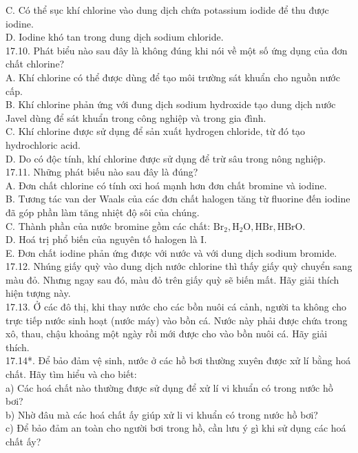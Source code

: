 \documentclass[10pt]{article}
\begin{document}
\begin{enumerate}
C. Có thể sục khí chlorine vào dung dịch chứa potassium iodide để thu được iodine.\\
D. Iodine khó tan trong dung dịch sodium chloride.\\
17.10. Phát biểu nào sau đây là không đúng khi nói về một số ứng dụng của đơn chất chlorine?\\
A. Khí chlorine có thể được dùng để tạo môi trường sát khuẩn cho nguồn nước cấp.\\
B. Khí chlorine phản ứng với đung dịch sodium hydroxide tạo dung dịch nước Javel dùng để sát khuẩn trong công nghiệp và trong gia đình.\\
C. Khí chlorine được sử dụng để sản xuất hydrogen chloride, từ đó tạo hydrochloric acid.\\
D. Do có độc tính, khí chlorine được sử dụng để trừ sâu trong nông nghiệp.\\
17.11. Những phát biếu nào sau đây là đúng?\\
A. Đơn chất chlorine có tính oxi hoá mạnh hơn đơn chất bromine và iodine.\\
B. Tương tác van der Waals của các đơn chất halogen tăng từ fluorine đến iodine đã góp phần làm tăng nhiệt độ sôi của chúng.\\
C. Thành phần của nước bromine gồm các chất: $\mathrm{Br}_{2}, \mathrm{H}_{2} \mathrm{O}, \mathrm{HBr}, \mathrm{HBrO}$.\\
D. Hoá trị phổ biến của nguyên tố halogen là I.\\
E. Đơn chất iodine phản ứng được với nước và với dung dịch sodium bromide.\\
17.12. Nhúng giấy quỳ vào dung dịch nước chlorine thì thấy giấy quỳ chuyển sang màu đỏ. Nhưng ngay sau đó, màu đỏ trên giấy quỳ sẽ biến mất. Hãy giải thích hiện tượng này.\\
17.13. Ở các đô thị, khi thay nước cho các bồn nuôi cá cảnh, người ta không cho trực tiếp nước sinh hoạt (nước máy) vào bồn cá. Nước này phải được chứa trong xô, thau, chậu khoảng một ngày rồi mới được cho vào bồn nuôi cá. Hãy giải thích.\\
17.14*. Để bảo đảm vệ sinh, nước ở các hồ bơi thường xuyên được xử lí bằng hoá chất. Hãy tìm hiểu và cho biết:\\
a) Các hoá chất nào thường được sử dụng để xử lí vi khuẩn có trong nước hồ bơi?\\
b) Nhờ đâu mà các hoá chất ấy giúp xử li vi khuẩn có trong nước hồ bơi?\\
c) Để bảo đảm an toàn cho người bơi trong hồ, cần lưu ý gì khi sử dụng các hoá chất ấy?\\

\end{enumerate}
\end{document}
